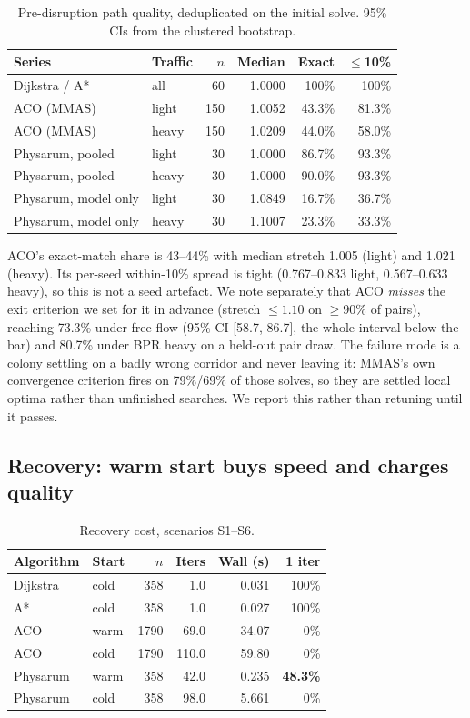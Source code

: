 \begin{table}[t]
\caption{Pre-disruption path quality, deduplicated on the initial solve.
95\% CIs from the clustered bootstrap.}
\label{tab:quality}
\centering
\small
\begin{tabular}{llrrrr}
\toprule
Series & Traffic & $n$ & Median & Exact & $\leq$10\% \\
\midrule
Dijkstra / A*      & all   & 60  & 1.0000 & 100\%  & 100\% \\
\midrule
ACO (MMAS)         & light & 150 & 1.0052 & 43.3\% & 81.3\% \\
ACO (MMAS)         & heavy & 150 & 1.0209 & 44.0\% & 58.0\% \\
\midrule
Physarum, pooled   & light & 30  & 1.0000 & 86.7\% & 93.3\% \\
Physarum, pooled   & heavy & 30  & 1.0000 & 90.0\% & 93.3\% \\
Physarum, model only & light & 30 & 1.0849 & 16.7\% & 36.7\% \\
Physarum, model only & heavy & 30 & 1.1007 & 23.3\% & 33.3\% \\
\bottomrule
\end{tabular}
\end{table}

ACO's exact-match share is 43--44\% with median stretch 1.005 (light) and
1.021 (heavy). Its per-seed within-10\% spread is tight (0.767--0.833 light,
0.567--0.633 heavy), so this is not a seed artefact. We note separately that
ACO \emph{misses} the exit criterion we set for it in advance (stretch $\leq 1.10$ on $\geq
90\%$ of pairs), reaching 73.3\% under free flow
(95\% CI [58.7, 86.7], the whole interval below the bar) and 80.7\% under
BPR heavy on a held-out pair draw. The failure mode is a colony settling on a
badly wrong corridor and never leaving it: MMAS's own convergence criterion
fires on 79\%/69\% of those solves, so they are settled local optima rather
than unfinished searches. We report this rather than retuning until it
passes.

\subsection{Recovery: warm start buys speed and charges quality}
\label{sec:recovery}

\begin{table}[t]
\caption{Recovery cost, scenarios S1--S6.}
\label{tab:recovery}
\centering
\small
\begin{tabular}{llrrrr}
\toprule
Algorithm & Start & $n$ & Iters & Wall (s) & 1 iter \\
\midrule
Dijkstra  & cold & 358 & 1.0  & 0.031 & 100\% \\
A*        & cold & 358 & 1.0  & 0.027 & 100\% \\
ACO       & warm & 1790 & 69.0 & 34.07 & 0\% \\
ACO       & cold & 1790 & 110.0 & 59.80 & 0\% \\
Physarum  & warm & 358 & 42.0 & 0.235 & \textbf{48.3\%} \\
Physarum  & cold & 358 & 98.0 & 5.661 & 0\% \\
\bottomrule
\end{tabular}
\end{table}


